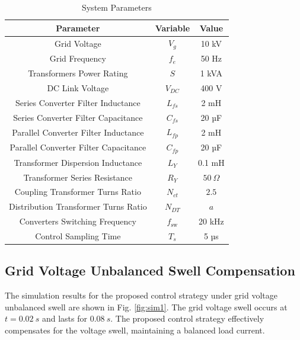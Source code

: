 \begin{table}[h!]
    \centering
    \caption{System Parameters}
    \begin{tabular}{|c|c|c|}
        \hline
        Parameter & Variable & Value \\
        \hline
        \hline
        Grid Voltage & $V_{g}$ & 10 kV \\
        Grid Frequency & $f_e$ & 50 Hz \\
        Transformers Power Rating & $S$ & 1 kVA \\
        DC Link Voltage & $V_{DC}$ & 400 V \\
        Series Converter Filter Inductance & $L_{fs}$ & 2 mH \\
        Series Converter Filter Capacitance & $C_{fs}$ & 20 µF \\
        Parallel Converter Filter Inductance & $L_{fp}$ & 2 mH \\
        Parallel Converter Filter Capacitance & $C_{fp}$ & 20 µF \\
        Transformer Dispersion Inductance & $L_Y$ & 0.1 mH \\
        Transformer Series Resistance & $R_Y$ & $50\ \Omega$\\
        Coupling Transformer Turns Ratio & $N_{ct}$ & $2.5$ \\
        Distribution Transformer Turns Ratio & $N_{DT}$ & $a$ \\
        Converters Switching Frequency & $f_{\text{sw}}$ & 20 kHz \\
        Control Sampling Time & $T_s$ & 5 µs \\
        \hline
    \end{tabular}
    \label{tab:params}
\end{table}


\subsection{Grid Voltage Unbalanced Swell Compensation}

The simulation results for the proposed control strategy under grid voltage unbalanced swell are shown in Fig. \ref{fig:sim1}. The grid voltage swell occurs at $t=0.02\ s$ and lasts for $0.08\ s$. The proposed control strategy effectively compensates for the voltage swell, maintaining a balanced load current. 

